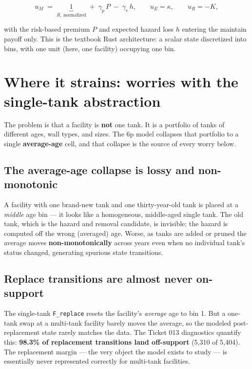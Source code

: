 \documentclass[
  letterpaper,
  DIV=11,
  numbers=noendperiod]{scrartcl}
\begin{document}
\[
u_M \;=\; \underbrace{1}_{R,\ \text{normalized}} \;+\; \gamma_{p}\, P
\;-\; \gamma_{r}\, h,
\qquad u_E = \kappa, \qquad u_R = -K,
\]

with the risk-based premium \(P\) and expected hazard loss \(h\)
entering the maintain payoff only. This is the textbook Rust
architecture: a scalar state discretized into bins, with one unit (here,
one facility) occupying one bin.

\section{Where it strains: worries with the single-tank
abstraction}\label{where-it-strains-worries-with-the-single-tank-abstraction}

The problem is that a facility is \textbf{not} one tank. It is a
portfolio of tanks of different ages, wall types, and sizes. The 6p
model collapses that portfolio to a single \textbf{average-age} cell,
and that collapse is the source of every worry below.

\subsection{The average-age collapse is lossy and
non-monotonic}\label{sec-avg}

A facility with one brand-new tank and one thirty-year-old tank is
placed at a \emph{middle} age bin --- it looks like a homogeneous,
middle-aged single tank. The old tank, which is the hazard and removal
candidate, is invisible; the hazard is computed off the wrong (averaged)
age. Worse, as tanks are added or pruned the average moves
\textbf{non-monotonically} across years even when no individual tank's
status changed, generating spurious state transitions.

\subsection{Replace transitions are almost never
on-support}\label{replace-transitions-are-almost-never-on-support}

The single-tank \texttt{F\_replace} resets the facility's \emph{average}
age to bin 1. But a one-tank swap at a multi-tank facility barely moves
the average, so the modeled post-replacement state rarely matches the
data. The Ticket 013 diagnostics quantify this: \textbf{98.3\% of
replacement transitions land off-support} (5,310 of 5,404). The
replacement margin --- the very object the model exists to study --- is
essentially never represented correctly for multi-tank facilities.
\end{document}
